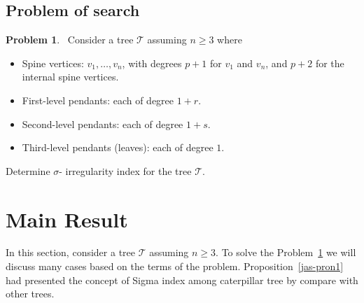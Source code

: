 \documentclass[12pt, a4paper]{article}
\theoremstyle{plain}  %
\theoremstyle{definition}  %
\newtheorem{problem}{Problem}
\newcommand{\TT}{\mathcal{T}}
\begin{document}
\subsection{Problem of search}


\begin{problem}~\label{problemnumber1}
Consider a tree $\TT$ assuming $n \geq 3$ where
\begin{itemize}
\item Spine vertices: $v_1, \dots, v_n$, with degrees $p+1$ for $v_1$ and $v_n$, and $p+2$ for the internal spine vertices.
\item First-level pendants: each of degree $1+r$.
\item Second-level pendants: each of degree $1+s$.
\item Third-level pendants (leaves): each of degree $1$.
\end{itemize} 
Determine $\sigma$- irregularity index for the tree $\TT$.
\end{problem}

\section{Main Result}
In this section, consider a tree $\TT$ assuming $n \geq 3$. To solve the Problem~\ref{problemnumber1} we will discuss many cases based on the terms of the problem. Proposition~\ref{jas-pron1} had presented the concept of Sigma index among caterpillar tree by compare with other trees.
\end{document}
